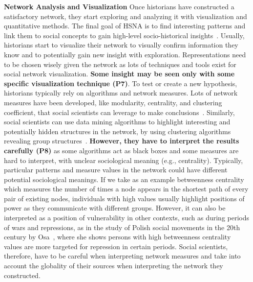 \noindent\textbf{Network Analysis and Visualization}
Once historians have constructed a satisfactory network, they start exploring and analyzing it with visualization and quantitative methods.
The final goal of HSNA is to find interesting patterns and link them to social concepts to gain high-level socio-historical insights~\cite{freemanDevelopmentSocialNetwork2004, wetherellHistoricalSocialNetwork1998}.
Usually, historians start to visualize their network to visually confirm information they know and to potentially gain new insight with exploration.
Representations need to be chosen wisely given the network as lots of techniques and tools exist for social network visualization. \textbf{Some insight may be seen only with some specific visualization technique (P7)}.
To test or create a new hypothesis, historians typically rely on algorithms and network measures.
Lots of network measures have been developed, like modularity, centrality, and clustering coefficient, that social scientists can leverage to make conclusions~\cite{scottSocialNetworkAnalysis1988}.
Similarly, social scientists can use data mining algorithms to highlight interesting and potentially hidden structures in the network, \eg by using clustering algorithms revealing group structures~\cite{brandesModularityClustering2008}.
\textbf{However, they have to interpret the results carefully (P8)} as some algorithms act as black boxes and some measures are hard to interpret, with unclear sociological meaning (e.g., centrality).
Typically, particular patterns and measure values in the network could have different potential sociological meanings.
If we take as an example betweenness centrality which measures the number of times a node appears in the shortest path of every pair of existing nodes, individuals with high values usually highlight positions of power as they communicate with different groups.
However, it can also be interpreted as a position of vulnerability in other contexts, such as during periods of wars and repressions, as in the study of Polish social movements in the 20th century by Osa~\cite{osaSolidarityContentionNetworks2003}, where she shows persons with high betweenness centrality values are more targeted for repression in certain periods.
Social scientists, therefore, have to be careful when interpreting network measures and take into account the globality of their sources when interpreting the network they constructed.



